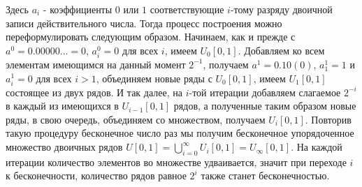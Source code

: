 \documentclass[12pt]{article}
\begin{document}
Здесь $a_i$ - коэффициенты $0$ или $1$ соответствующие $i$-тому разряду двоичной записи действительного числа. Тогда процесс построения можно переформулировать следующим образом. Начинаем, как и прежде с $a^0 = 0.00000\dots = 0$, $a^0_i = 0$ для всех $i$, имеем $U_0[0, 1]$. Добавляем ко всем элементам имеющимся на данный момент $2^{-1}$, получаем $a^1 = 0.10(0)$, $a^1_1 = 1$ и $a^1_i = 0$ для всех $i > 1$, объединяем новые ряды с $U_0[0, 1]$, имеем $U_1[0, 1]$ состоящее из двух рядов. И так далее, на $i$-той итерации добавляем слагаемое $2^{-i}$ в каждый из имеющихся в $U_{i-1}[0, 1]$ рядов, а полученные таким образом новые ряды, в свою очередь, объединяем со множеством, получаем $U_i[0, 1]$. Повторив такую процедуру бесконечное число раз мы получим бесконечное упорядоченное множество двоичных рядов $U[0, 1] = \bigcup\limits^{\infty}_{i = 0} U_i[0, 1] = U_\infty[0, 1]$. На каждой итерации количество элементов во множестве удваивается, значит при переходе $i$ к бесконечности, количество рядов равное $2^i$ также станет бесконечностью.
\end{document}
